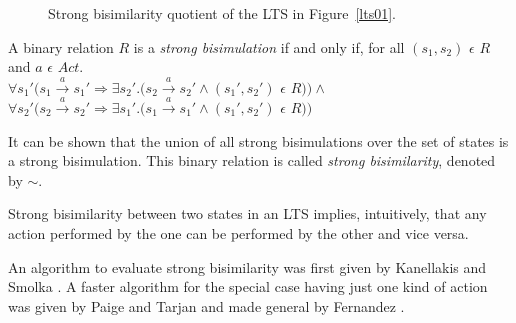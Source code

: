 \begin{SCfigure}
  \centering
  \def\svgwidth{0.5\columnwidth}
  
  \caption{Strong bisimilarity quotient of the LTS in Figure~\ref{lts01}.}
\end{SCfigure}

A binary relation $R$ is a \textit{strong
  bisimulation} if and only if, for all $(s_1, s_2)$ $\epsilon$ $R$ and $a$ $\epsilon$ $Act .$\\
$\forall s_1' (s_1 \xrightarrow{a} s_1' \Rightarrow \exists s_2'
. (s_2 \xrightarrow{a} s_2' \wedge (s_1', s_2')$ $\epsilon$ $R ) )
\wedge $ \\
$\forall s_2' (s_2 \xrightarrow{a} s_2' \Rightarrow \exists s_1'
. (s_1 \xrightarrow{a} s_1' \wedge (s_1', s_2')$ $\epsilon$ $R ) )$

It can be shown that the union of
all strong bisimulations over the set of states is a strong
bisimulation. This binary relation is called \textit{strong
  bisimilarity}, denoted by $\sim$.

Strong bisimilarity between two states in an LTS implies,
intuitively, that any action performed by the one can be performed by
the other and vice versa.

An algorithm to evaluate strong bisimilarity was first given by
Kanellakis and Smolka \cite{kanellakis1990ccs}. A faster algorithm for
the special case having just one kind of action was given by Paige and
Tarjan \cite{paige1987three} and made general by Fernandez
\cite{fernandez1990implementation}.
